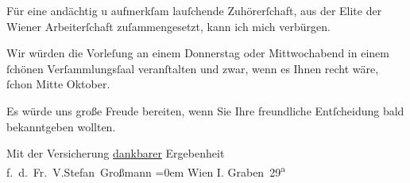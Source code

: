 \pstart
           Für eine andächtig u aufmerkſam lauſchende Zuhörerſchaft, aus der Elite der Wiener Arbeiterſchaft zuſammengesetzt, kann ich
               mich verbürgen.\pend
           
\pstart
           Wir würden die Vorleſung an einem Donnerstag oder Mittwochabend in einem ſchönen
               Verſammlungsſaal veranſtalten und zwar, wenn es Ihnen recht wäre, ſchon Mitte
               Oktober.\pend
           
\pstart
            Es würde uns große Freude bereiten, wenn Sie
               Ihre freundliche Entſcheidung bald bekanntgeben wollten.\pend
           
\pstart
           Mit der Versicherung \uline{dankbarer} Ergebenheit{\\[\baselineskip]}
                  f. d. Fr. V.\spacefill\mbox{Stefan Großmann}\pend
           \leftskip=0em{}
\pstart
           \noindent{}Wien I. Graben 29\textsuperscript{a}\pend
           \endnumbering{}  
      